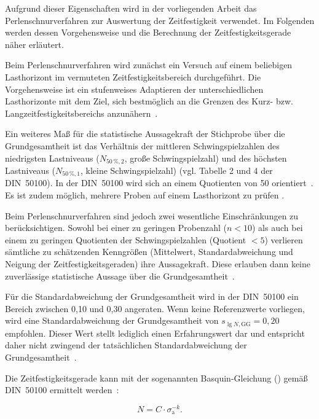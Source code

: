 Aufgrund dieser Eigenschaften wird in der vorliegenden Arbeit das Perlenschnurverfahren zur Auswertung der Zeitfestigkeit verwendet. Im Folgenden werden dessen Vorgehensweise und die Berechnung der Zeitfestigkeitsgerade näher erläutert.

Beim Perlenschnurverfahren wird zunächst ein Versuch auf einem beliebigen Lasthorizont im vermuteten Zeitfestigkeitsbereich durchgeführt. Die Vorgehensweise ist ein stufenweises Adaptieren der unterschiedlichen Lasthorizonte mit dem Ziel, sich bestmöglich an die Grenzen des Kurz- bzw. Langzeitfestigkeitsbereichs anzunähern~\cite[Seite~26]{DIN50100}.\clearpage

Ein weiteres Maß für die statistische Aussagekraft der Stichprobe über die Grundgesamtheit ist das Verhältnis der mittleren Schwingspielzahlen des niedrigsten Lastniveaus ($N_{50\,\%,2}$, große Schwingspielzahl) und des höchsten Lastniveaus ($N_{50\,\%,1}$, kleine Schwingspielzahl) (vgl. Tabelle 2 und 4 der DIN~50100). In der DIN~50100 wird sich an einem Quotienten von 50 orientiert~\cite[Seite~30]{DIN50100}. Es ist zudem möglich, mehrere Proben auf einem Lasthorizont zu prüfen \cite[Seite 278]{Eulitz2022}.

Beim Perlenschnurverfahren sind jedoch zwei wesentliche Einschränkungen zu berücksichtigen. Sowohl bei einer zu geringen Probenzahl ($n < 10$) als auch bei einem zu geringen Quotienten der Schwingspielzahlen (Quotient $< 5$) verlieren sämtliche zu schätzenden Kenngrößen (Mittelwert, Standardabweichung und Neigung der Zeitfestigkeitsgeraden) ihre Aussagekraft. Diese erlauben dann keine zuverlässige statistische Aussage über die Grundgesamtheit~\cite[Seite~30]{DIN50100}. 

Für die Standardabweichung der Grundgesamtheit wird in der DIN~50100 ein Bereich zwischen 0,10 und 0,30 angeraten. Wenn keine Referenzwerte vorliegen, wird eine Standardabweichung der Grundgesamtheit von $s_{\lg N,\mathrm{GG}} = 0{,}20$ empfohlen. Dieser Wert stellt lediglich einen Erfahrungswert dar und entspricht daher nicht zwingend der tatsächlichen Standardabweichung der Grundgesamtheit~\cite[Seite~30]{DIN50100}. 

Die Zeitfestigkeitsgerade kann mit der sogenannten Basquin-Gleichung () gemäß DIN~50100 ermittelt werden~\cite[Seite~15]{DIN50100}:

\begin{equation}\label{eq:Zeitfestigkeitsgerade_C}
    N = C \cdot \sigma_{\mathrm{a}}^{-k}.
\end{equation}

